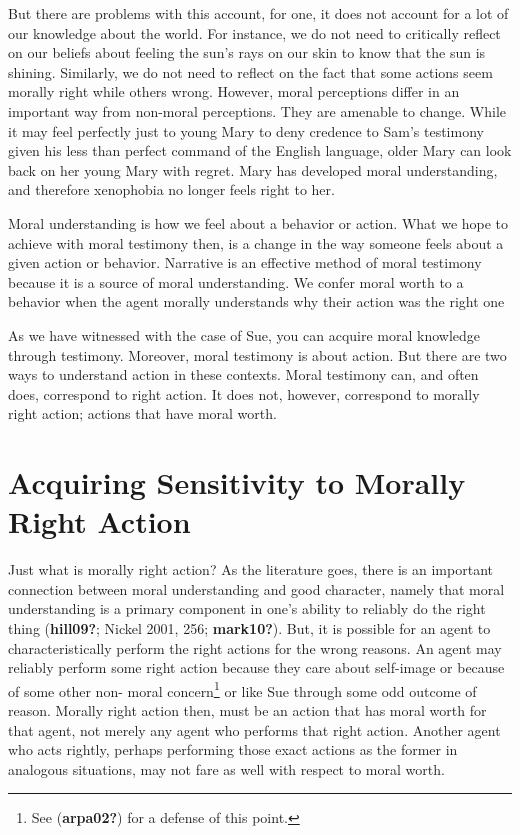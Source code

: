 \documentclass[12pt]{book}
\theoremstyle{definition}
\theoremstyle{remark}
\begin{document}
But there are problems with this account, for one, it does not account for a lot of our knowledge about the world. For instance, we do not need to critically reflect on our beliefs about feeling the sun's rays on our skin to know that the sun is shining. Similarly, we do not need to reflect on the fact that some actions seem morally right while others wrong. However, moral perceptions differ in an important way from non-moral perceptions. They are amenable to change. While it may feel perfectly just to young Mary to deny credence to Sam's testimony given his less than perfect command of the English language, older Mary can look back on her young Mary with regret. Mary has developed moral understanding, and therefore xenophobia no longer feels right to her.

Moral understanding is how we feel about a behavior or action. What we hope to achieve with moral testimony then, is a change in the way someone feels about a given action or behavior. Narrative is an effective method of moral testimony because it is a source of moral understanding. We confer moral worth to a behavior when the agent morally understands why their action was the right one

As we have witnessed with the case of Sue, you can acquire moral knowledge through testimony. Moreover, moral testimony is about action. But there are two ways to understand action in these contexts. Moral testimony can, and often does, correspond to right action. It does not, however, correspond to morally right action; actions that have moral worth.

\section{Acquiring Sensitivity to Morally Right Action}\label{acquiring-sensitivity-to-morally-right-action}

Just what is morally right action? As the literature goes, there is an important connection between moral understanding and good character, namely that moral understanding is a primary component in one's ability to reliably do the right thing (\textbf{hill09?}; Nickel 2001, 256; \textbf{mark10?}). But, it is possible for an agent to characteristically perform the right actions for the wrong reasons. An agent may reliably perform some right action because they care about self-image or because of some other non- moral concern\footnote{See (\textbf{arpa02?}) for a defense of this point.} or like Sue through some odd outcome of reason. Morally right action then, must be an action that has moral worth for that agent, not merely any agent who performs that right action. Another agent who acts rightly, perhaps performing those exact actions as the former in analogous situations, may not fare as well with respect to moral worth.
\end{document}
